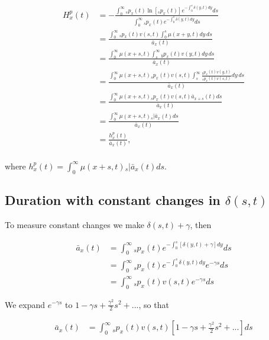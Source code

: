 \documentclass[12pt]{article}
\begin{document}
\begin{equation} \label{eq:EntropyAnnuityA1}
\begin{split}
{H}^{p}_{x}(t) &= -\frac{ \int_{0}^{\infty}{}_sp_x(t)\ln[{}_sp_x(t)] e^{-\int_{0}^{s}\delta(y,t)dy} ds}{\int_0^\infty {}_sp_x(t) e^{-\int_{0}^{s}\delta(y,t)dy} ds}\\
&= \frac{\int_0^\infty {}_sp_x(t) {v}(s,t) \int_0^s \mu(x+y,t) dy\,ds}{\bar{a}_x(t)}\\
&= \frac{\int_0^\infty  \mu(x+s,t) \int_s^\infty {}_yp_x(t) {v}(y,t)  dy\,ds}{\bar{a}_x(t)}\\
&= \frac{\int_0^\infty  \mu(x+s,t)  {}_sp_x(t) {v}(s,t) \int_s^\infty \frac{ {}_yp_x(t) {v}(y,t)}{ {}_sp_x(t) {v}(s,t)}  dy\,ds}{\bar{a}_x(t)}\\
&=  \frac{\int_0^\infty \mu(x+s,t)   {}_sp_x(t) {v}(s,t) \bar{a}_{x+s}(t) ds}{\bar{a}_x(t)} \\
&=  \frac{\int_0^\infty \mu(x+s,t)  {}_s|\bar{a}_x(t) ds}{\bar{a}_x(t)} \\
&=  \frac{{h}^{p}_{x}(t)}{\bar{a}_x(t)}, \\
\end{split}
\end{equation}

where ${h}^{p}_{x}(t)=\int_0^\infty \mu(x+s,t)   {}_s|\bar{a}_x(t) ds$.



\subsection{Duration with constant changes in $\delta(s,t)$}\label{sec:DurConst}

To measure constant changes we make $\delta(s,t)+\gamma$, then

\begin{equation}\label{eq:DurationConst1}
\begin{split}
\bar{a}_{x}(t) &= \int_0^\infty {}_sp_x(t) e^{- \int_{0}^{s} [\delta(y,t)+\gamma]dy}ds \\
&= \int_0^\infty {}_sp_x(t) e^{- \int_{0}^{s}\delta(y,t)dy}e^{-\gamma s}ds \\
&= \int_0^\infty {}_sp_x(t) {v}(s,t)e^{-\gamma s}ds
\end{split}
\end{equation}

We expand $e^{-\gamma s}$ to $1-\gamma s+\frac{\gamma^2}{2} s^{2} +...$, so that


\begin{equation}\label{eq:DurationConst1}
\begin{split}
\bar{a}_{x}(t) &= \int_0^\infty {}_sp_x(t) {v}(s,t)[1-\gamma s+\frac{\gamma^2}{2} s^{2} +...]ds
\end{split}
\end{equation}
\end{document}
